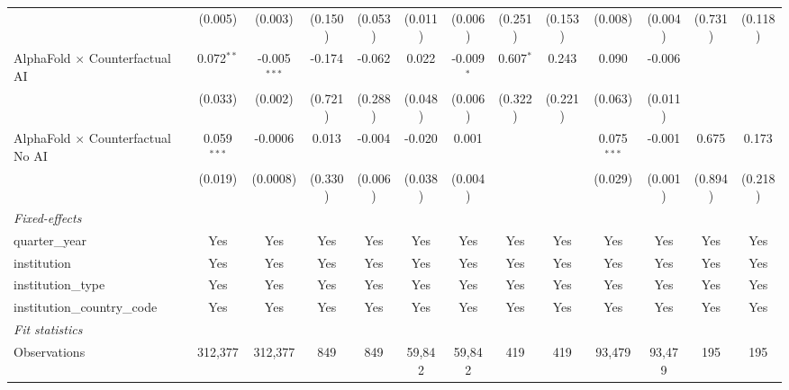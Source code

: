 \begin{tabular}{lcccccccccccc}
                                            & (0.005)       & (0.003)        & (0.150)      & (0.053)     & (0.011)       & (0.006)       & (0.251)       & (0.153) & (0.008)       & (0.004)       & (0.731) & (0.118)\\   
   AlphaFold $\times$ Counterfactual AI     & 0.072$^{**}$  & -0.005$^{***}$ & -0.174       & -0.062      & 0.022         & -0.009$^{*}$  & 0.607$^{*}$   & 0.243   & 0.090         & -0.006        &         &   \\   
                                            & (0.033)       & (0.002)        & (0.721)      & (0.288)     & (0.048)       & (0.006)       & (0.322)       & (0.221) & (0.063)       & (0.011)       &         &   \\   
   AlphaFold $\times$ Counterfactual No AI  & 0.059$^{***}$ & -0.0006        & 0.013        & -0.004      & -0.020        & 0.001         &               &         & 0.075$^{***}$ & -0.001        & 0.675   & 0.173\\   
                                            & (0.019)       & (0.0008)       & (0.330)      & (0.006)     & (0.038)       & (0.004)       &               &         & (0.029)       & (0.001)       & (0.894) & (0.218)\\   
   \midrule
   \emph{Fixed-effects}\\
   quarter\_year                            & Yes           & Yes            & Yes          & Yes         & Yes           & Yes           & Yes           & Yes     & Yes           & Yes           & Yes     & Yes\\  
   institution                              & Yes           & Yes            & Yes          & Yes         & Yes           & Yes           & Yes           & Yes     & Yes           & Yes           & Yes     & Yes\\  
   institution\_type                        & Yes           & Yes            & Yes          & Yes         & Yes           & Yes           & Yes           & Yes     & Yes           & Yes           & Yes     & Yes\\  
   institution\_country\_code               & Yes           & Yes            & Yes          & Yes         & Yes           & Yes           & Yes           & Yes     & Yes           & Yes           & Yes     & Yes\\  
   \midrule
   \emph{Fit statistics}\\
   Observations                             & 312,377       & 312,377        & 849          & 849         & 59,842        & 59,842        & 419           & 419     & 93,479        & 93,479        & 195     & 195\\  

\end{tabular}

